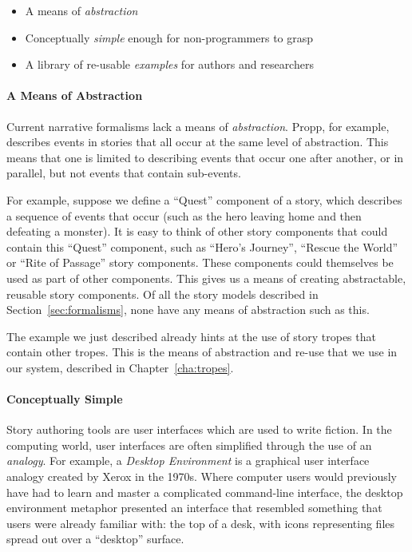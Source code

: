 \documentclass[11pt]{report}
\begin{document}
\begin{itemize}
  \item A means of \emph{abstraction}
  \item Conceptually \emph{simple} enough for non-programmers to grasp
  \item A library of re-usable \emph{examples} for authors and researchers
\end{itemize}

\paragraph{A Means of Abstraction}
Current narrative formalisms lack a means of \emph{abstraction}. Propp,
for example, describes events in stories that all occur at the same level of
abstraction. This means that one is limited to describing events that occur one
after another, or in parallel, but not events that contain sub-events.

For example, suppose we define a ``Quest'' component of a story, which describes a
sequence of events that occur (such as the hero leaving home and then defeating
a monster). It is easy to think of other story components that could contain
this ``Quest'' component, such as ``Hero's Journey'', ``Rescue the World'' or
``Rite of Passage'' story components. These components could themselves be used
as part of other components. This gives us a means of creating abstractable,
reusable story components. Of all the story models described in
Section~\ref{sec:formalisms}, none have any means of abstraction such as this.

The example we just described already hints at the use of story tropes that
contain other tropes. This is the means of abstraction and re-use that we use in
our system, described in Chapter~\ref{cha:tropes}.

\paragraph{Conceptually Simple}
Story authoring tools are user interfaces which are used to write fiction. In
the computing world, user interfaces are often simplified through the use of an
\emph{analogy}. For example, a \emph{Desktop Environment} is a graphical user
interface analogy created by Xerox in the 1970s. Where computer users would
previously have had to learn and master a complicated command-line interface,
the desktop environment metaphor presented an interface that resembled something
that users were already familiar with: the top of a desk, with icons
representing files spread out over a ``desktop'' surface.
\end{document}
